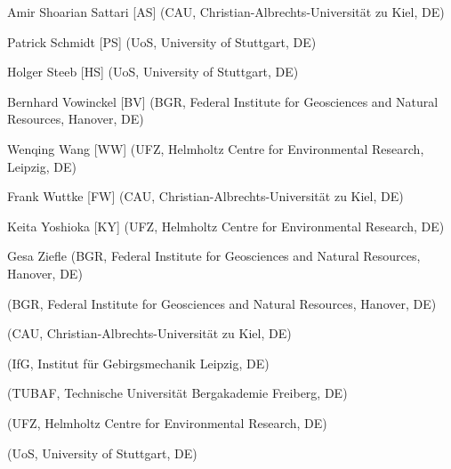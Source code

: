 \begin{list}{-}{\leftmargin=1em \itemindent=0em \itemsep=0.1em}
\item Amir Shoarian Sattari [AS] (CAU, Christian-Albrechts-Universität zu Kiel, DE)

\item Patrick Schmidt [PS] (UoS, University of Stuttgart, DE)	

\item Holger Steeb [HS] (UoS, University of Stuttgart, DE)	

\item Bernhard Vowinckel [BV] (BGR, Federal Institute for Geosciences and Natural Resources, Hanover, DE)	

\item Wenqing Wang [WW] (UFZ, Helmholtz Centre for Environmental Research, Leipzig, DE) 

\item Frank Wuttke [FW] (CAU, Christian-Albrechts-Universität zu Kiel, DE)	

\item Keita Yoshioka [KY] (UFZ, Helmholtz Centre for Environmental Research, DE) 

\item Gesa Ziefle (BGR, Federal Institute for Geosciences and Natural Resources, Hanover, DE)	

\item [] (BGR, Federal Institute for Geosciences and Natural Resources, Hanover, DE)	
\item [] (CAU, Christian-Albrechts-Universität zu Kiel, DE)	
\item [] (IfG, Institut für Gebirgsmechanik Leipzig, DE)	
\item [] (TUBAF, Technische Universität Bergakademie Freiberg, DE)	
\item [] (UFZ, Helmholtz Centre for Environmental Research, DE)	
\item [] (UoS, University of Stuttgart, DE)	

\end{list}
